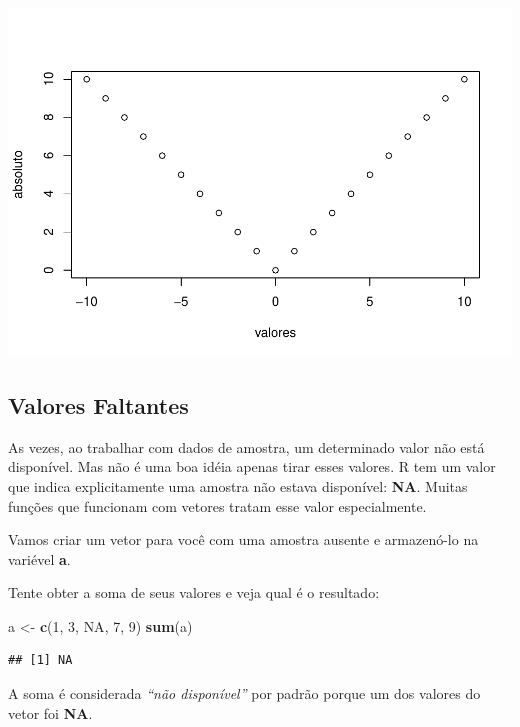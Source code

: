 \documentclass[]{book}
\newenvironment{Shaded}{\begin{snugshade}}{\end{snugshade}}
\newcommand{\DecValTok}[1]{\textcolor[rgb]{0.00,0.00,0.81}{#1}}
\newcommand{\KeywordTok}[1]{\textcolor[rgb]{0.13,0.29,0.53}{\textbf{#1}}}
\newcommand{\NormalTok}[1]{#1}
\newcommand{\OtherTok}[1]{\textcolor[rgb]{0.56,0.35,0.01}{#1}}
\newcommand{\StringTok}[1]{\textcolor[rgb]{0.31,0.60,0.02}{#1}}
\begin{document}
\includegraphics{TudodoR_files/figure-latex/unnamed-chunk-47-1.pdf}

\hypertarget{valores-faltantes}{%
\subsection{Valores Faltantes}\label{valores-faltantes}}

As vezes, ao trabalhar com dados de amostra, um determinado valor não está disponível. Mas não é uma boa idéia apenas tirar esses valores. R tem um valor que indica explicitamente uma amostra não estava disponível: \textbf{NA}. Muitas funções que funcionam com vetores tratam esse valor especialmente.

Vamos criar um vetor para você com uma amostra ausente e armazenó-lo na variével \textbf{a}.

Tente obter a soma de seus valores e veja qual é o resultado:

\begin{Shaded}
\begin{Highlighting}[]
\NormalTok{a <-}\StringTok{ }\KeywordTok{c}\NormalTok{(}\DecValTok{1}\NormalTok{, }\DecValTok{3}\NormalTok{, }\OtherTok{NA}\NormalTok{, }\DecValTok{7}\NormalTok{, }\DecValTok{9}\NormalTok{)}
\KeywordTok{sum}\NormalTok{(a)}
\end{Highlighting}
\end{Shaded}

\begin{verbatim}
## [1] NA
\end{verbatim}

A soma é considerada \emph{``não disponível''} por padrão porque um dos valores do vetor foi \textbf{NA}.
\end{document}
